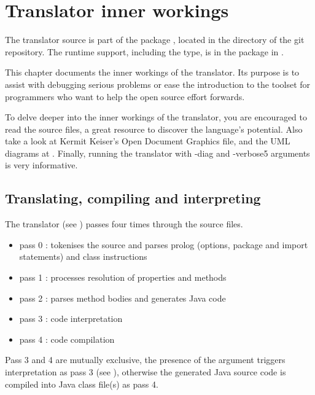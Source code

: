 
\chapter{Translator inner workings}

The translator source is part of the package
, located in the  directory of the git repository.
The runtime support, including the  type, is in the package  in .

This chapter documents the inner workings of the
translator. Its purpose is to assist with debugging
serious problems or ease the introduction to the toolset for
programmers who want to help the open source effort forwards.

To delve deeper into the inner workings of the translator, you are encouraged to read the \nr{} source files,
a great resource to discover the language's potential. Also take a look at Kermit Keiser's
Open Document Graphics file, and the \nr{} UML diagrams at .
Finally, running the translator with -diag and -verbose5 arguments is very informative.


\section{Translating, compiling and interpreting}
The translator (see ) passes four times through the \nr{} source files.
\begin{itemize}
    \item pass 0 : tokenises the source and parses prolog (options, package and import statements) and
 class instructions
    \item pass 1 : processes resolution of properties and methods
    \item pass 2 : parses method bodies and generates Java code
    \item pass 3 : code interpretation
    \item pass 4 : code compilation
\end{itemize}
Pass 3 and 4 are mutually exclusive, the presence of the  argument triggers interpretation
as pass 3 (see ),
otherwise the generated Java source code is compiled into Java class file(s) as pass 4.


